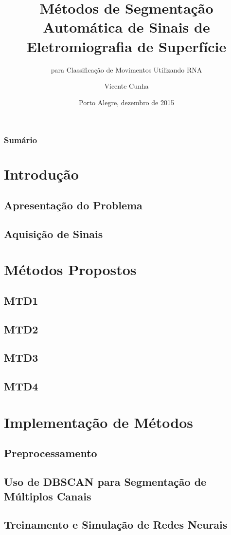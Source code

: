 \documentclass{beamer}
\title[Métodos de Segmentação Automática de Sinais de sEMG] %
{Métodos de Segmentação Automática de Sinais de Eletromiografia de Superfície}
\subtitle{para Classificação de Movimentos Utilizando RNA}
\author[Cunha] %
{Vicente Cunha}
\institute[UFRGS] %
{
  Universidade Federal do Rio Grande do Sul
}
\date[dezembro de 2015] %
{Porto Alegre, dezembro de 2015}
\begin{document}
	
	\frame{\titlepage}
	
	\begin{frame}
		\frametitle{Sumário}
		\tableofcontents[currentsection]
	\end{frame}
	
	\section[Introdução]{Introdução}
	\subsection[Apresentação]{Apresentação do Problema}
	\subsection[Aquisição]{Aquisição de Sinais}

	\section[Métodos Propostos]{Métodos Propostos}
	\subsection[MTD1]{MTD1}
	\subsection[MTD2]{MTD2}
	\subsection[MTD3]{MTD3}
	\subsection[MTD4]{MTD4}
	
	\section[Implementação]{Implementação de Métodos}
	\subsection[Preprocessamento]{Preprocessamento}
	\subsection[DBSCAN]{Uso de DBSCAN para Segmentação de Múltiplos Canais}
	\subsection[RNA]{Treinamento e Simulação de Redes Neurais}
\end{document}
